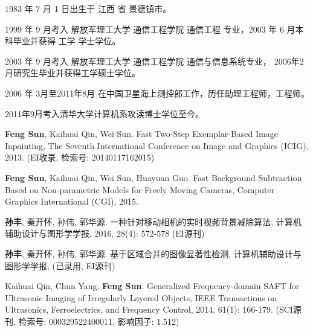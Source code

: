 \begin{resume}


  1983 年 7 月 1 日出生于 江西 省 景德镇市。

  1999 年 9 月考入 解放军理工大学 通信工程学院  通信工程 专业，2003 年 6 月本科毕业并获得 工学 学士学位。

  2003 年 9 月考入 解放军理工大学 通信工程学院 通信与信息系统专业， 2006年2月研究生毕业并获得工学硕士学位。

  2006 年 3月至2011年8月 在中国卫星海上测控部工作，历任助理工程师，工程师。

  2011年9月考入清华大学计算机系攻读博士学位至今。




  \begin{publications}
    \item {\bf Feng Sun}, Kaihuai Qin, Wei Sun. Fast Two-Step Exemplar-Based Image Inpainting,
   The Seventh International Conference on Image and Graphics (ICIG), 2013. (EI收录, 检索号: 20140117162015)
    \item  {\bf Feng Sun}, Kaihuai Qin, Wei Sun, Huayuan Guo. Fast Background Subtraction Based on Non-parametric Models for Freely Moving Cameras,
    Computer Graphics International (CGI), 2015.
    \item {\bf 孙丰}, 秦开怀, 孙伟, 郭华源. 一种针对移动相机的实时视频背景减除算法, 计算机辅助设计与图形学学报, 2016, 28(4): 572-578 (EI源刊)
  \end{publications}

  \begin{publications}[before=\publicationskip,after=\publicationskip]
    
    \item {\bf 孙丰}, 秦开怀, 孙伟, 郭华源. 基于区域合并的图像显著性检测, 计算机辅助设计与图形学学报, (已录用, EI源刊)
  \end{publications}

  \begin{publications}
    \item  Kaihuai Qin, Chun Yang, {\bf Feng Sun}. Generalized Frequency-domain SAFT for Ultrasonic Imaging of Irregularly Layered Objects,
    IEEE Transactions on Ultrasonics, Ferroelectrics, and Frequency Control, 2014, 61(1): 166-179. (SCI源刊, 检索号: 000329522400011, 影响因子: 1.512)





\end{publications}
\end{resume}
